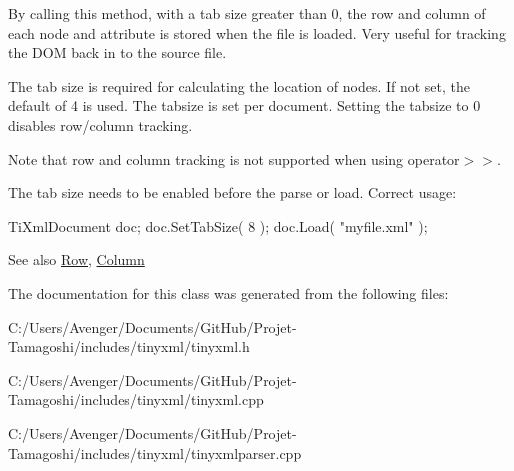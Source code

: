 By calling this method, with a tab size greater than 0, the row and column of each node and attribute is stored when the file is loaded. Very useful for tracking the D\+O\+M back in to the source file.

The tab size is required for calculating the location of nodes. If not set, the default of 4 is used. The tabsize is set per document. Setting the tabsize to 0 disables row/column tracking.

Note that row and column tracking is not supported when using operator$>$$>$.

The tab size needs to be enabled before the parse or load. Correct usage\+: \begin{DoxyVerb}TiXmlDocument doc;
doc.SetTabSize( 8 );
doc.Load( "myfile.xml" );
\end{DoxyVerb}


\begin{DoxySeeAlso}{See also}
\hyperlink{class_ti_xml_base_a024bceb070188df92c2a8d8852dd0853}{Row}, \hyperlink{class_ti_xml_base_ab54bfb9b70fe6dd276e7b279cab7f003}{Column} 
\end{DoxySeeAlso}


The documentation for this class was generated from the following files\+:\begin{DoxyCompactItemize}
\item 
C\+:/\+Users/\+Avenger/\+Documents/\+Git\+Hub/\+Projet-\/\+Tamagoshi/includes/tinyxml/tinyxml.\+h\item 
C\+:/\+Users/\+Avenger/\+Documents/\+Git\+Hub/\+Projet-\/\+Tamagoshi/includes/tinyxml/tinyxml.\+cpp\item 
C\+:/\+Users/\+Avenger/\+Documents/\+Git\+Hub/\+Projet-\/\+Tamagoshi/includes/tinyxml/tinyxmlparser.\+cpp\end{DoxyCompactItemize}
